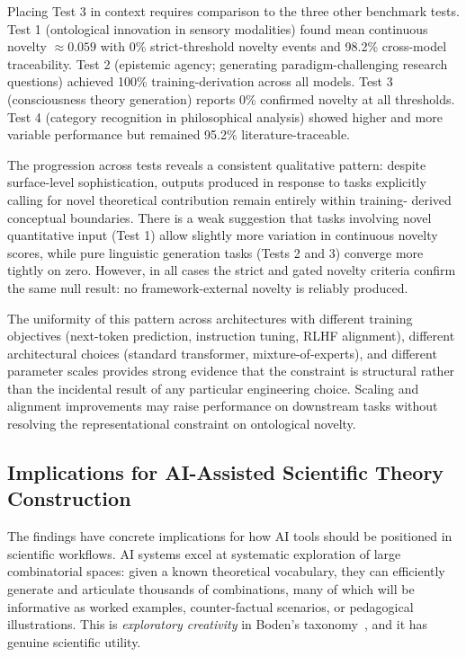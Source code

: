\documentclass[pdflatex,sn-mathphys-num]{sn-jnl}
\begin{document}
Placing Test 3 in context requires comparison to the three other benchmark
tests.  Test 1 (ontological innovation in sensory modalities) found mean
continuous novelty $\approx 0.059$ with 0\% strict-threshold novelty events
and 98.2\% cross-model traceability.  Test 2 (epistemic agency; generating
paradigm-challenging research questions) achieved 100\% training-derivation
across all models.  Test 3 (consciousness theory generation) reports 0\%
confirmed novelty at all thresholds.  Test 4 (category recognition in
philosophical analysis) showed higher and more variable performance but
remained 95.2\% literature-traceable.

The progression across tests reveals a consistent qualitative pattern: despite
surface-level sophistication, outputs produced in response to tasks explicitly
calling for novel theoretical contribution remain entirely within training-
derived conceptual boundaries.  There is a weak suggestion that tasks involving
novel quantitative input (Test 1) allow slightly more variation in continuous
novelty scores, while pure linguistic generation tasks (Tests 2 and 3) converge
more tightly on zero.  However, in all cases the strict and gated novelty
criteria confirm the same null result: no framework-external novelty is reliably
produced.

The uniformity of this pattern across architectures with different training
objectives (next-token prediction, instruction tuning, RLHF alignment),
different architectural choices (standard transformer, mixture-of-experts),
and different parameter scales provides strong evidence that the constraint is
structural rather than the incidental result of any particular engineering
choice.  Scaling and alignment improvements may raise performance on downstream
tasks without resolving the representational constraint on ontological novelty.

\subsection{Implications for AI-Assisted Scientific Theory Construction}

The findings have concrete implications for how AI tools should be positioned in
scientific workflows.  AI systems excel at systematic exploration of large
combinatorial spaces: given a known theoretical vocabulary, they can efficiently
generate and articulate thousands of combinations, many of which will be
informative as worked examples, counter-factual scenarios, or pedagogical
illustrations.  This is \emph{exploratory creativity} in Boden's
taxonomy~\cite{boden2004creative}, and it has genuine scientific utility.
\end{document}
